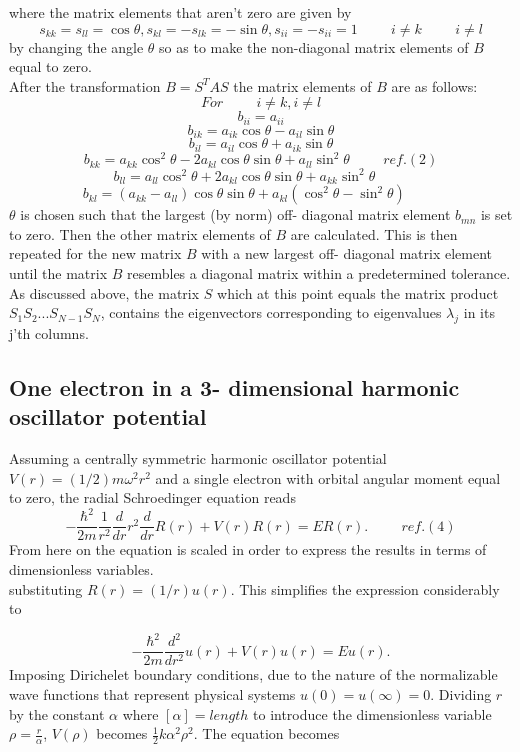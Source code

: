 \documentclass[10pt,a4paper]{article}
\begin{document}
where the matrix elements that aren't zero are given by
$$
s_{kk}=s_{ll}=\cos\theta,s_{kl}=-s_{lk}=-\sin\theta,s_{ii}=-s_{ii}=1\hspace{1cm} i\neq k\hspace{1cm} i\neq l
$$
by changing the angle $\theta$ so as to make the non-diagonal matrix elements of $B$ equal to zero.\\After the transformation $B=S^TAS$ the matrix elements of $B$ are as follows:
$$
For \hspace{1cm} i\neq k,i \neq l
$$
$$
b_{ii} = a_{ii}
$$
$$
b_{ik} = a_{ik}\cos\theta - a_{il}\sin\theta
$$
$$
b_{il} = a_{il}\cos\theta + a_{ik}\sin\theta
$$
$$
b_{kk} = a_{kk}\cos^2\theta - 2a_{kl}\cos\theta \sin\theta + a_{ll}\sin^2\theta \hspace{1cm} ref. (2)
$$
$$
b_{ll} = a_{ll}\cos^2\theta + 2a_{kl}\cos\theta \sin\theta + a_{kk}\sin^2\theta \hspace{1cm}
$$
$$
b_{kl} = (a_{kk}-a_{ll})\cos\theta \sin\theta + a_{kl}(\cos^2\theta-\sin^2\theta) \hspace{1cm}
$$
$\theta$ is chosen such that the largest (by norm) off- diagonal matrix element $b_{mn}$ is set to zero. Then the other matrix elements of $B$ are calculated. This is then repeated for the new matrix $B$ with a new largest off- diagonal matrix element until the matrix $B$ resembles a diagonal matrix within a predetermined tolerance. As discussed above, the matrix $S$ which at this point equals the matrix product $S_1S_2...S_{N-1}S_N$, contains the eigenvectors corresponding to eigenvalues $\lambda_j$ in its j'th columns.
\subsection{One electron in a 3- dimensional harmonic oscillator potential}
Assuming a centrally symmetric harmonic oscillator potential $V(r) = (1/2)m\omega^2r^2$ and a single electron with orbital angular moment equal to zero, the radial Schroedinger equation reads
\begin{equation*}
-\frac{\hbar^2}{2 m} \frac{1}{r^2} \frac{d}{dr} r^2\frac{d}{dr}R(r)+ V(r) R(r) = E R(r). \hspace{1cm} ref.(4)
\end{equation*}
From here on the equation is scaled in order to express the results in terms of dimensionless variables.\\
substituting $R(r) = (1/r) u(r)$. This simplifies the expression considerably to

\begin{equation*}
  -\frac{\hbar^2}{2 m} \frac{d^2}{dr^2}u(r)+ V(r) u(r) = E u(r).
\end{equation*}
Imposing Dirichelet boundary conditions, due to the nature of the normalizable wave functions that represent physical systems $u(0)=u(\infty)=0$. Dividing $r$ by the constant $\alpha$ where $[\alpha] = length$ to introduce the dimensionless variable $\rho =\frac{r}{\alpha}$, $V(\rho)$ becomes $\frac{1}{2}k\alpha^2 \rho^2$. The equation becomes
\end{document}
